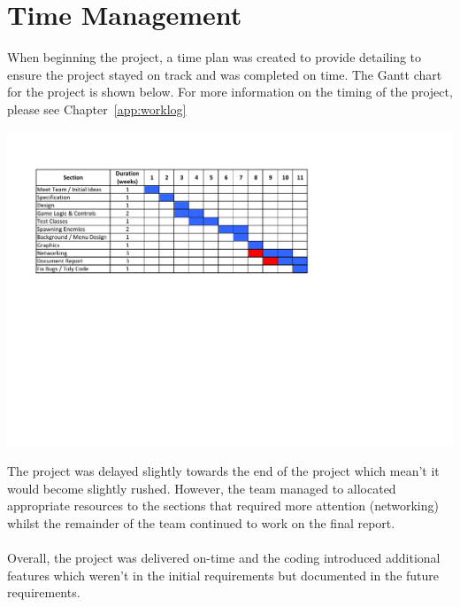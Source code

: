 \section{Time Management}
\label{sec: time_management}
When beginning the project, a time plan was created to provide detailing to ensure the project stayed on track and was completed on time. The Gantt chart for the project is shown below. For more information on the timing of the project, please see Chapter~\ref{app:worklog}
\begin{center}
\includegraphics[width=16cm]{gantt.pdf}
\end{center}
The project was delayed slightly towards the end of the project which mean't it would become slightly rushed. However, the team managed to allocated appropriate resources to the sections that required more attention (networking) whilst the remainder of the team continued to work on the final report.\\\\
Overall, the project was delivered on-time and the coding introduced additional features which weren't in the initial requirements but documented in the future requirements.

